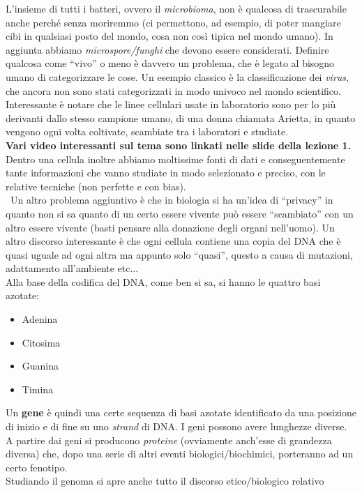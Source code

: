 \documentclass[a4paper,12pt, oneside]{book}
\begin{document}
L'insieme di tutti i batteri, ovvero il \textit{microbioma}, non è qualcosa di
trascurabile anche perché senza moriremmo (ci permettono, ad esempio, di poter
mangiare cibi in qualsiasi posto del mondo, cosa non così tipica nel mondo
umano). In aggiunta abbiamo \textit{microspore/funghi} che devono essere
considerati. Definire qualcosa come ``vivo'' o meno è davvero un problema, che è
legato al bisogno umano di categorizzare le cose. Un esempio classico è la
classificazione dei \textit{virus}, che ancora non sono stati categorizzati in
modo univoco nel mondo scientifico. Interessante è notare che le linee cellulari
usate in laboratorio sono per lo più derivanti dallo stesso campione umano, di
una donna chiamata Arietta, in quanto vengono ogni volta coltivate, scambiate
tra i laboratori e studiate.\\
\textbf{Vari video interessanti sul tema sono linkati nelle slide della lezione
  1.}\\
Dentro una cellula inoltre abbiamo moltissime fonti di dati e conseguentemente
tante informazioni che vanno studiate in modo selezionato e preciso, con le
relative tecniche (non perfette e con bias).\\\
Un altro problema aggiuntivo è che in biologia si ha un'idea di ``privacy'' in
quanto non si sa quanto di un certo essere vivente può essere ``scambiato'' con
un altro essere vivente (basti pensare alla donazione degli organi
nell'uomo). Un altro discorso interessante è che ogni cellula contiene una copia
del DNA che è quasi uguale ad ogni altra ma appunto solo ``quasi'', questo a
causa di mutazioni, adattamento all'ambiente etc$\ldots$\\
Alla base della codifica del DNA, come ben si sa, si hanno le quattro basi
azotate:
\begin{itemize}
  \item Adenina
  \item Citosima
  \item Guanina
  \item Timina
\end{itemize}
Un \textbf{gene} è quindi una certe sequenza di basi azotate identificato da una
posizione di inizio e di fine su uno \textit{strand} di DNA. I geni possono
avere lunghezze diverse. A partire dai geni
si producono \textit{proteine} (ovviamente anch'esse di grandezza diversa) che,
dopo una serie di altri eventi biologici/biochimici, porteranno ad un certo
fenotipo.\\ 
Studiando il genoma si apre anche tutto il discorso etico/biologico relativo
\end{document}
